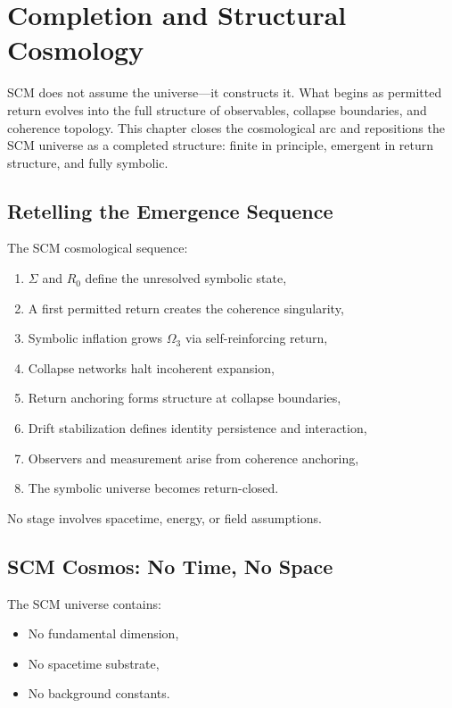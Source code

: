 \chapter{Completion and Structural Cosmology} \label{chapter-completion-cosmology}

SCM does not assume the universe—it constructs it. What begins as permitted return evolves into the full structure of observables, collapse boundaries, and coherence topology. This chapter closes the cosmological arc and repositions the SCM universe as a completed structure: finite in principle, emergent in return structure, and fully symbolic.

\section{Retelling the Emergence Sequence} \label{sec:retelling}

The SCM cosmological sequence:
\begin{enumerate}
  \item $\Sigma$ and $R_0$ define the unresolved symbolic state,
  \item A first permitted return creates the coherence singularity,
  \item Symbolic inflation grows $\Omega_3$ via self-reinforcing return,
  \item Collapse networks halt incoherent expansion,
  \item Return anchoring forms structure at collapse boundaries,
  \item Drift stabilization defines identity persistence and interaction,
  \item Observers and measurement arise from coherence anchoring,
  \item The symbolic universe becomes return-closed.
\end{enumerate}

No stage involves spacetime, energy, or field assumptions.

\section{SCM Cosmos: No Time, No Space} \label{sec:scm-cosmos}

The SCM universe contains:
\begin{itemize}
  \item No fundamental dimension,
  \item No spacetime substrate,
  \item No background constants.
\end{itemize}

